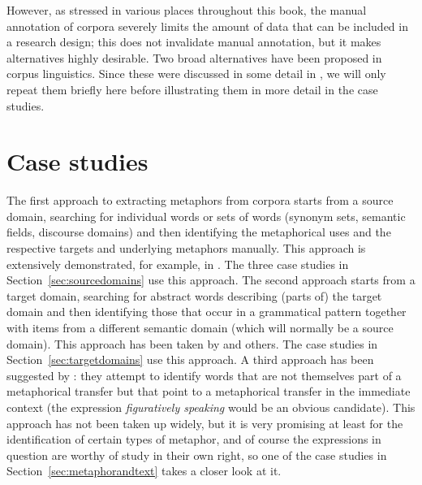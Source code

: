 However, as stressed in various places throughout this book, the manual  annotation  of corpora severely limits the amount of data that can be included in a research design;  this does not invalidate manual annotation, but it makes alternatives highly desirable. Two broad alternatives have been proposed in corpus linguistics. Since these were discussed in some detail in , we will only repeat them briefly here before illustrating them in more detail in the case studies.

\section{Case studies}
\label{sec:metaphorcasestudies}

The first approach to extracting  metaphors  from corpora starts from a source domain, searching for individual words or sets of words (synonym  sets, semantic  fields, discourse domains) and then identifying the metaphorical uses and the respective targets and underlying metaphors manually.  This approach is extensively demonstrated, for example, in \citet{deignan_corpus-based_1999, deignan_metaphorical_1999, deignan_metaphor_2005}. The three case studies in Section~\ref{sec:sourcedomains} use this approach. The second approach starts from a target domain, searching for abstract words describing (parts of) the target domain and then identifying those that occur in a grammatical  pattern together with items from a different semantic  domain (which will normally be a source domain). This approach has been taken by \citet{stefanowitsch_happiness_2004, stefanowitsch_words_2006} and others. The case studies in Section~\ref{sec:targetdomains} use this approach. A third approach has been suggested by \citet{wallington_metaphoricity_2003}: they attempt to identify words that are not themselves part of a metaphorical  transfer but that point to a metaphorical transfer in the immediate context (the expression \textit{figuratively speaking} would be an obvious candidate). This approach has not been taken up widely, but it is very promising at least for the identification of certain types of metaphor, and of course the expressions in question are worthy of study in their own right, so one of the case studies in Section~\ref{sec:metaphorandtext} takes a closer look at it.

